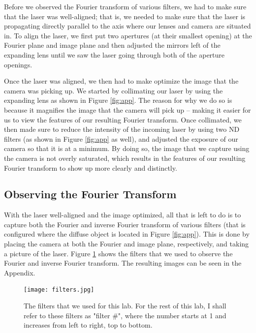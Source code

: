 \documentclass[twocolumn,amsmath,amssymb,pra]{revtex4-2}
\begin{document}
Before we observed the Fourier transform of various filters, we had to make sure that the laser was well-aligned; that is, we needed to make sure that the laser is propagating directly parallel to the axis where our lenses and camera are situated in. To align the laser, we first put two apertures (at their smallest opening) at the Fourier plane and image plane and then adjusted the mirrors left of the expanding lens until we saw the laser going through both of the aperture openings. 

Once the laser was aligned, we then had to make optimize the image that the camera was picking up. We started by collimating our laser by using the expanding lens as shown in Figure \ref{fig:app}. The reason for why we do so is because it magnifies the image that the camera will pick up -- making it easier for us to view the features of our resulting Fourier transform. Once collimated, we then made sure to reduce the intensity of the incoming laser by using two ND filters (as shown in Figure \ref{fig:app} as well), and adjusted the exposure of our camera so that it is at a minimum. By doing so, the image that we capture using the camera is not overly saturated, which results in the features of our resulting Fourier transform to show up more clearly and distinctly.

\subsection{Observing the Fourier Transform}
With the laser well-aligned and the image optimized, all that is left to do is to capture both the Fourier and inverse Fourier transform of various filters (that is configured where the diffuse object is located in Figure \ref{fig:app}). This is done by placing the camera at both the Fourier and image plane, respectively, and taking a picture of the laser. Figure \ref{fig:filters} shows the filters that we used to observe the Fourier and inverse Fourier transform. The resulting images can be seen in the Appendix.
\begin{figure}
    \centering
    \texttt{[image: filters.jpg]}
    \caption{The filters that we used for this lab. For the rest of this lab, I shall refer to these filters as "filter \#", where the number starts at 1 and increases from left to right, top to bottom.}
    \label{fig:filters}
\end{figure}
\end{document}
